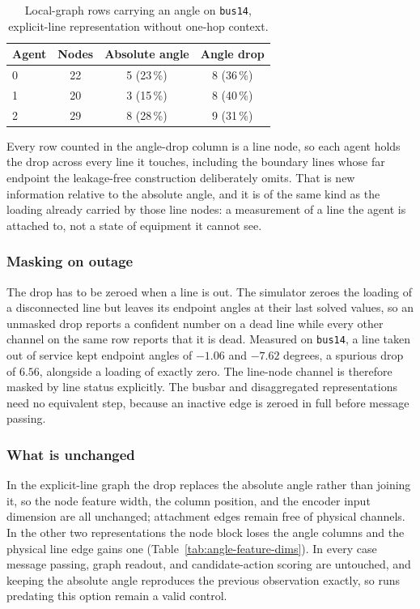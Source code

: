 \begin{table}[H]
  \centering
  \small
  \caption{Local-graph rows carrying an angle on \texttt{bus14}, explicit-line
  representation without one-hop context.}
  \label{tab:angle-coverage}
  \setlength{\tabcolsep}{6pt}
  \begin{tabular}{lccc}
    \toprule
    Agent & Nodes & Absolute angle & Angle drop \\
    \midrule
    0 & 22 & 5 \; (23\,\%) & 8 \; (36\,\%) \\
    1 & 20 & 3 \; (15\,\%) & 8 \; (40\,\%) \\
    2 & 29 & 8 \; (28\,\%) & 9 \; (31\,\%) \\
    \bottomrule
  \end{tabular}
\end{table}

Every row counted in the angle-drop column is a line node, so each agent holds
the drop across every line it touches, including the boundary lines whose far
endpoint the leakage-free construction deliberately omits. That is new
information relative to the absolute angle, and it is of the same kind as the
loading already carried by those line nodes: a measurement of a line the agent
is attached to, not a state of equipment it cannot see.

\subsubsection{Masking on outage}

The drop has to be zeroed when a line is out. The simulator zeroes the loading
of a disconnected line but leaves its endpoint angles at their last solved
values, so an unmasked drop reports a confident number on a dead line while
every other channel on the same row reports that it is dead. Measured on
\texttt{bus14}, a line taken out of service kept endpoint angles of $-1.06$ and
$-7.62$ degrees, a spurious drop of $6.56$, alongside a loading of exactly zero.
The line-node channel is therefore masked by line status explicitly. The busbar
and disaggregated representations need no equivalent step, because an inactive
edge is zeroed in full before message passing.

\subsubsection{What is unchanged}

In the explicit-line graph the drop replaces the absolute angle rather than
joining it, so the node feature width, the column position, and the encoder
input dimension are all unchanged; attachment edges remain free of physical
channels. In the other two representations the node block loses the angle
columns and the physical line edge gains one
(Table~\ref{tab:angle-feature-dims}). In every case message passing, graph
readout, and candidate-action scoring are untouched, and keeping the absolute
angle reproduces the previous observation exactly, so runs predating this option
remain a valid control.

